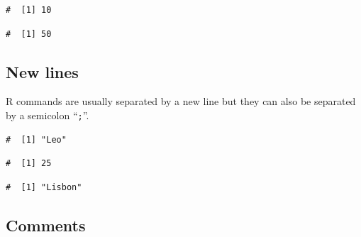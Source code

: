 \documentclass[a4paper,9pt,twocolumn,twoside,printwatermark=false]{pinp}
\begin{document}
\begin{ShadedResult}
\begin{verbatim}
#  [1] 10
\end{verbatim}
\end{ShadedResult}

\begin{Shaded}
\begin{Highlighting}[]
\end{Highlighting}
\end{Shaded}

\begin{ShadedResult}
\begin{verbatim}
#  [1] 50
\end{verbatim}
\end{ShadedResult}

\subsection{New lines}\label{new-lines}

R commands are usually separated by a new line but they can also be
separated by a semicolon ``\texttt{;}''.

\begin{Shaded}
\begin{Highlighting}[]
\StringTok{ }
\end{Highlighting}
\end{Shaded}

\begin{ShadedResult}
\begin{verbatim}
#  [1] "Leo"
\end{verbatim}
\end{ShadedResult}\begin{ShadedResult}
\begin{verbatim}
#  [1] 25
\end{verbatim}
\end{ShadedResult}\begin{ShadedResult}
\begin{verbatim}
#  [1] "Lisbon"
\end{verbatim}
\end{ShadedResult}

\subsection{Comments}\label{comments}
\end{document}

